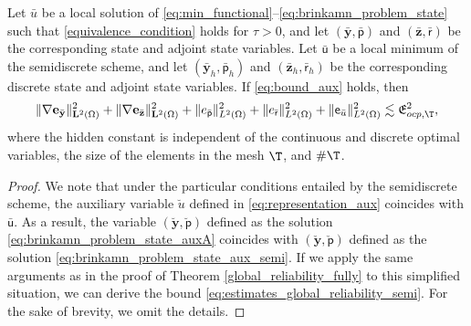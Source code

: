 \documentclass[final]{siamart0216}
\begin{document}
\begin{theorem} 
Let $\bar{u}$ be a local solution of \eqref{eq:min_functional}--\eqref{eq:brinkamn_problem_state} such that \eqref{equivalence_condition} holds for $\tau > 0$, and let 
$(\bar{\mathbf{y}},\bar{\mathsf{p}})$ and $(\bar{\mathbf{z}},\bar{\mathsf{r}})$ be the corresponding state and adjoint state variables. Let $\bar{\mathsf{u}}$ be a local minimum of the semidiscrete scheme, and let $(\bar{\mathbf{y}}_h,\bar{\mathsf{p}}_h)$ and $(\bar{\mathbf{z}}_h,\bar{\mathsf{r}}_h)$ be the corresponding discrete state and adjoint state variables. If \eqref{eq:bound_aux} holds, then
% 
\begin{align}\label{eq:estimates_global_reliability_semi}
\|\nabla \mathbf{e}_{\bar{\mathbf{y}}} \|_{\mathbf{L}^2(\Omega)}^2 + \|\nabla \mathbf{e}_{\bar{\mathbf{z}}} \|_{\mathbf{L}^2(\Omega)}^2 + \| e_{\bar{\mathsf{p}}} \|_{L^2(\Omega)}^2 + \| e_{\bar{\mathsf{r}}} \|_{L^2(\Omega)}^2 + \|\mathsf{e}_{\bar{u}}\|_{L^2(\Omega)}^2\lesssim \mathfrak{E}_{ocp,\T}^2,
\end{align}
where the hidden constant is independent of the continuous and discrete optimal variables, the size of the elements in the mesh $\T$, and $\#\T$.
\end{theorem}
\begin{proof}
We note that under the particular conditions entailed by the semidiscrete scheme, the auxiliary variable $\breve{u}$ defined in \eqref{eq:representation_aux} coincides with $\bar{\mathsf{u}}$. As a result, the variable $(\breve{\mathbf{y}},\breve{\mathsf{p}})$ defined as the solution \eqref{eq:brinkamn_problem_state_auxA} coincides with $(\check{\mathbf{y}},\check{\mathsf{p}})$ defined as the solution \eqref{eq:brinkamn_problem_state_aux_semi}. If we apply the same arguments as in the proof of Theorem \ref{global_reliability_fully} to this simplified situation, we can derive the bound \eqref{eq:estimates_global_reliability_semi}.  For the sake of brevity, we omit the details.
\end{proof}
\end{document}
